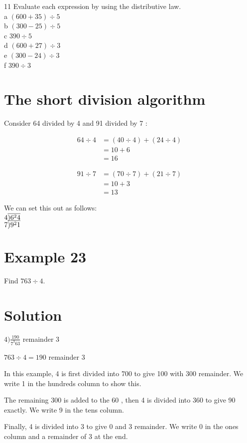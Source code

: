 \documentclass[10pt]{article}
\newcommand\longdiv[1]{\overline{\smash{)}#1}}
\begin{document}
11 Evaluate each expression by using the distributive law.\\
a \((600+35) \div 5\)\\
b \((300-25) \div 5\)\\
c \(390 \div 5\)\\
d \((600+27) \div 3\)\\
e \((300-24) \div 3\)\\
f \(390 \div 3\)

\section*{The short division algorithm}
Consider 64 divided by 4 and 91 divided by 7 :

\[
\begin{aligned}
64 \div 4 & =(40 \div 4)+(24 \div 4) \\
& =10+6 \\
& =16
\end{aligned}
\]

\[
\begin{aligned}
91 \div 7 & =(70 \div 7)+(21 \div 7) \\
& =10+3 \\
& =13
\end{aligned}
\]

We can set this out as follows:\\
\(4 \longdiv { 6 ^ { 2 } 4 }\)\\
\(7 \longdiv { 9 ^ { 2 } 1 }\)

\section*{Example 23}
Find \(763 \div 4\).

\section*{Solution}
\(4) \frac{190}{7^{3} 63}\) remainder 3

\(763 \div 4=190\) remainder 3

In this example, 4 is first divided into 700 to give 100 with 300 remainder. We write 1 in the hundreds column to show this.

The remaining 300 is added to the 60 , then 4 is divided into 360 to give 90 exactly. We write 9 in the tens column.

Finally, 4 is divided into 3 to give 0 and 3 remainder. We write 0 in the ones column and a remainder of 3 at the end.
\end{document}

